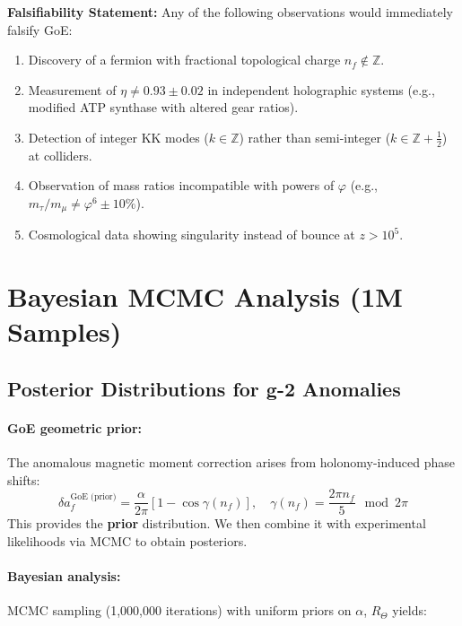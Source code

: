 \documentclass[12pt]{article}
\begin{document}
\textbf{Falsifiability Statement:} Any of the following observations would immediately falsify GoE:
\begin{enumerate}
\item Discovery of a fermion with fractional topological charge $n_f \notin \mathbb{Z}$.
\item Measurement of $\eta \neq 0.93 \pm 0.02$ in independent holographic systems (e.g., modified ATP synthase with altered gear ratios).
\item Detection of integer KK modes ($k \in \mathbb{Z}$) rather than semi-integer ($k \in \mathbb{Z} + \tfrac{1}{2}$) at colliders.
\item Observation of mass ratios incompatible with powers of $\varphi$ (e.g., $m_\tau / m_\mu \neq \varphi^6 \pm 10\%$).
\item Cosmological data showing singularity instead of bounce at $z > 10^5$.
\end{enumerate}

\section{Bayesian MCMC Analysis (1M Samples)}

\subsection{Posterior Distributions for g-2 Anomalies}

\paragraph{GoE geometric prior:} The anomalous magnetic moment correction arises from holonomy-induced phase shifts:
\begin{equation}
\delta a_f^{\text{GoE (prior)}} = \frac{\alpha}{2\pi} \left[1 - \cos\gamma(n_f)\right], \quad \gamma(n_f) = \frac{2\pi n_f}{5} \mod 2\pi
\end{equation}
This provides the \textbf{prior} distribution. We then combine it with experimental likelihoods via MCMC to obtain posteriors.

\paragraph{Bayesian analysis:} MCMC sampling (1,000,000 iterations) with uniform priors on $\alpha$, $R_\Theta$ yields:
\end{document}
